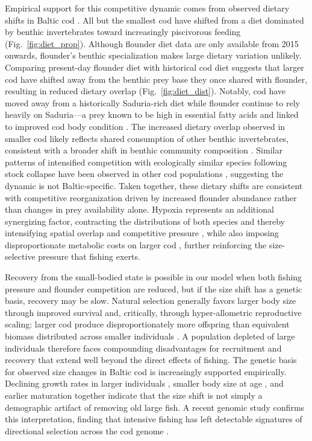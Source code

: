 \documentclass[12pt]{article}
\begin{document}
Empirical support for this competitive dynamic comes from observed dietary shifts in Baltic cod \citep{Kulatska2019, Haase2020, Neuenfeldt2020}. All but the smallest cod have shifted from a diet dominated by benthic invertebrates toward increasingly piscivorous feeding (Fig.~\ref{fig:diet_prop}). Although flounder diet data are only available from 2015 onwards, flounder's benthic specialization makes large dietary variation unlikely. Comparing present-day flounder diet with historical cod diet suggests that larger cod have shifted away from the benthic prey base they once shared with flounder, resulting in reduced dietary overlap (Fig.~\ref{fig:diet_dist}). Notably, cod have moved away from a historically Saduria-rich diet while flounder continue to rely heavily on Saduria---a prey known to be high in essential fatty acids and linked to improved cod body condition \citep{Lindmark2023, Rojbek2012}. The increased dietary overlap observed in smaller cod likely reflects shared consumption of other benthic invertebrates, consistent with a broader shift in benthic community composition \citep{Gogina2016}. Similar patterns of intensified competition with ecologically similar species following stock collapse have been observed in other cod populations \citep{Bundy2005, Walters2001}, suggesting the dynamic is not Baltic-specific. Taken together, these dietary shifts are consistent with competitive reorganization driven by increased flounder abundance rather than changes in prey availability alone. Hypoxia represents an additional synergizing factor, contracting the distributions of both species and thereby intensifying spatial overlap and competitive pressure \citep{Orio2019}, while also imposing disproportionate metabolic costs on larger cod \citep{Rubalcaba2020}, further reinforcing the size-selective pressure that fishing exerts.

Recovery from the small-bodied state is possible in our model when both fishing pressure and flounder competition are reduced, but if the size shift has a genetic basis, recovery may be slow. Natural selection generally favors larger body size through improved survival \citep{Olsen2011} and, critically, through hyper-allometric reproductive scaling: larger cod produce disproportionately more offspring than equivalent biomass distributed across smaller individuals \citep{Barneche2018}. A population depleted of large individuals therefore faces compounding disadvantages for recruitment and recovery that extend well beyond the direct effects of fishing. The genetic basis for observed size changes in Baltic cod is increasingly supported empirically. Declining growth rates in larger individuals \citep{Mion2021}, smaller body size at age \citep{ICES2022}, and earlier maturation \citep{Koster2017} together indicate that the size shift is not simply a demographic artifact of removing old large fish. A recent genomic study confirms this interpretation, finding that intensive fishing has left detectable signatures of directional selection across the cod genome \citep{han2025genomic}.
\end{document}
